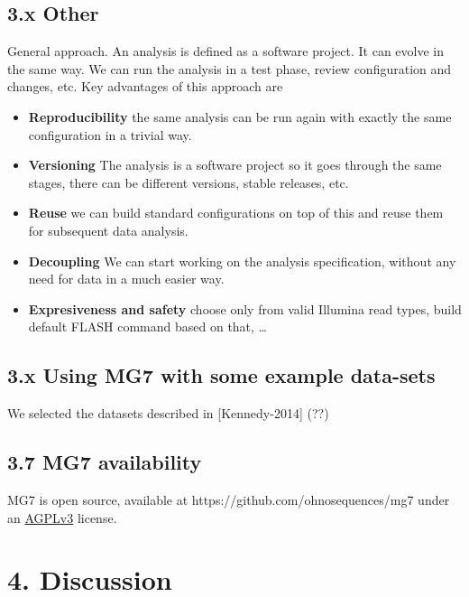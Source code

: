 \documentclass{frontiersSCNS} %
\providecommand{\tightlist}{%
\setlength{\itemsep}{0pt}\setlength{\parskip}{0pt}}
\begin{document}
\subsection{3.x Other}\label{x-other}

General approach. An analysis is defined as a software project. It can
evolve in the same way. We can run the analysis in a test phase, review
configuration and changes, etc. Key advantages of this approach are

\begin{itemize}
\tightlist
\item
  \textbf{Reproducibility} the same analysis can be run again with
  exactly the same configuration in a trivial way.
\item
  \textbf{Versioning} The analysis is a software project so it goes
  through the same stages, there can be different versions, stable
  releases, etc.
\item
  \textbf{Reuse} we can build standard configurations on top of this and
  reuse them for subsequent data analysis.
\item
  \textbf{Decoupling} We can start working on the analysis
  specification, without any need for data in a much easier way.
\item
  \textbf{Expresiveness and safety} choose only from valid Illumina read
  types, build default FLASH command based on that, \ldots{}
\end{itemize}

\subsection{3.x Using MG7 with some example
data-sets}\label{x-using-mg7-with-some-example-data-sets}

We selected the datasets described in {[}Kennedy-2014{]} (??)

\subsection{3.7 MG7 availability}\label{mg7-availability}

MG7 is open source, available at https://github.com/ohnosequences/mg7
under an \href{http://www.gnu.org/licenses/agpl-3.0.en.html}{AGPLv3}
license.

\section{4. Discussion}\label{discussion}
\end{document}
